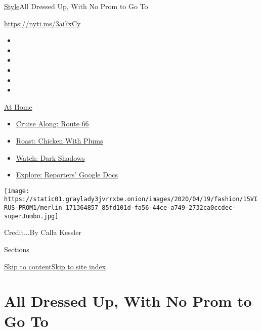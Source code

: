 \href{/section/style}{Style}\textbar{}All Dressed Up, With No Prom to Go
To

\url{https://nyti.ms/3ai7xCy}

\begin{itemize}
\item
\item
\item
\item
\item
\item
\end{itemize}

\href{https://www.nytimes3xbfgragh.onion/spotlight/at-home?action=click\&pgtype=Article\&state=default\&region=TOP_BANNER\&context=at_home_menu}{At
Home}

\begin{itemize}
\tightlist
\item
  \href{https://www.nytimes3xbfgragh.onion/2020/09/07/travel/route-66.html?action=click\&pgtype=Article\&state=default\&region=TOP_BANNER\&context=at_home_menu}{Cruise
  Along: Route 66}
\item
  \href{https://www.nytimes3xbfgragh.onion/2020/09/04/dining/sheet-pan-chicken.html?action=click\&pgtype=Article\&state=default\&region=TOP_BANNER\&context=at_home_menu}{Roast:
  Chicken With Plums}
\item
  \href{https://www.nytimes3xbfgragh.onion/2020/09/04/arts/television/dark-shadows-stream.html?action=click\&pgtype=Article\&state=default\&region=TOP_BANNER\&context=at_home_menu}{Watch:
  Dark Shadows}
\item
  \href{https://www.nytimes3xbfgragh.onion/interactive/2020/at-home/even-more-reporters-editors-diaries-lists-recommendations.html?action=click\&pgtype=Article\&state=default\&region=TOP_BANNER\&context=at_home_menu}{Explore:
  Reporters' Google Docs}
\end{itemize}

\texttt{[image: https://static01.graylady3jvrrxbe.onion/images/2020/04/19/fashion/15VIRUS-PROM1/merlin\_171364857\_85fd101d-fa56-44ce-a749-2732ca0ccdec-superJumbo.jpg]}

Credit...By Calla Kessler

Sections

\protect\hyperlink{site-content}{Skip to
content}\protect\hyperlink{site-index}{Skip to site index}

\hypertarget{all-dressed-up-with-no-prom-to-go-to}{%
\section{All Dressed Up, With No Prom to Go
To}\label{all-dressed-up-with-no-prom-to-go-to}}

